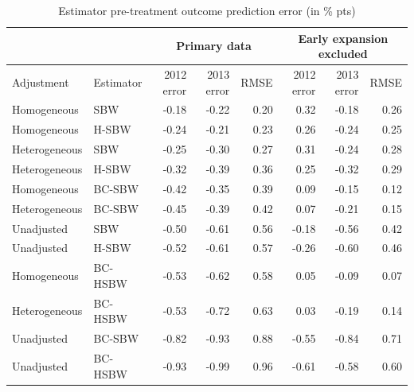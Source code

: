 \documentclass[aoas]{imsart}
\theoremstyle{plain}
\theoremstyle{remark}
\begin{document}
\begin{table}[]
    \centering
\begin{longtable}{llrrrrrr}\caption{Estimator
pre-treatment outcome prediction error (in \% pts)}\label{tab:pretxpred}
 \hline
 &  & \multicolumn{3}{c}{Primary data} & \multicolumn{3}{c}{Early expansion 
 excluded} \\
 \hline
Adjustment & Estimator & 2012 error & 2013 error & RMSE & 2012 error & 2013 error & RMSE \\ 
\hline
Homogeneous & SBW & -0.18 & -0.22 & 0.20 & 0.32 & -0.18 & 0.26 \\ 
Homogeneous & H-SBW & -0.24 & -0.21 & 0.23 & 0.26 & -0.24 & 0.25 \\ 
Heterogeneous & SBW & -0.25 & -0.30 & 0.27 & 0.31 & -0.24 & 0.28 \\ 
Heterogeneous & H-SBW & -0.32 & -0.39 & 0.36 & 0.25 & -0.32 & 0.29 \\ 
Homogeneous & BC-SBW & -0.42 & -0.35 & 0.39 & 0.09 & -0.15 & 0.12 \\ 
Heterogeneous & BC-SBW & -0.45 & -0.39 & 0.42 & 0.07 & -0.21 & 0.15 \\ 
Unadjusted & SBW & -0.50 & -0.61 & 0.56 & -0.18 & -0.56 & 0.42 \\ 
Unadjusted & H-SBW & -0.52 & -0.61 & 0.57 & -0.26 & -0.60 & 0.46 \\ 
Homogeneous & BC-HSBW & -0.53 & -0.62 & 0.58 & 0.05 & -0.09 & 0.07 \\ 
Heterogeneous & BC-HSBW & -0.53 & -0.72 & 0.63 & 0.03 & -0.19 & 0.14 \\ 
Unadjusted & BC-SBW & -0.82 & -0.93 & 0.88 & -0.55 & -0.84 & 0.71 \\ 
Unadjusted & BC-HSBW & -0.93 & -0.99 & 0.96 & -0.61 & -0.58 & 0.60 
 \hline
\end{longtable}
\end{table}
\end{document}
